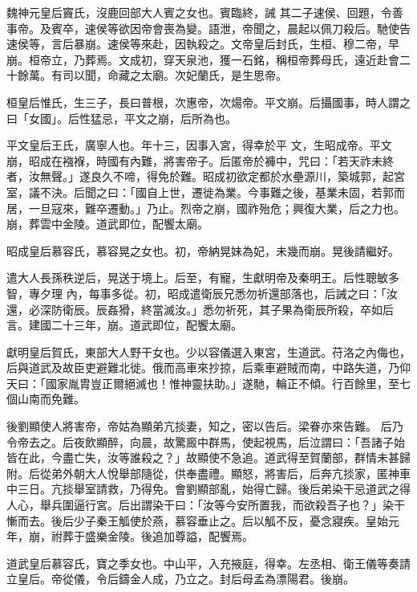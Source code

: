 \begin{pinyinscope}
 魏神元皇后竇氏，沒鹿回部大人賓之女也。賓臨終，誡
 其二子速侯、回題，令善事帝。及賓卒，速侯等欲因帝會喪為變。語泄，帝聞之，晨起以佩刀殺后。馳使告速侯等，言后暴崩。速侯等來赴，因執殺之。文帝皇后封氏，生桓、穆二帝，早崩。桓帝立，乃葬焉。文成初，穿天泉池，獲一石銘，稱桓帝葬母氏，遠近赴會二十餘萬。有司以聞，命藏之太廟。次妃蘭氏，是生思帝。



 桓皇后惟氏，生三子，長曰普根，次惠帝，次煬帝。平文崩。后攝國事，時人謂之曰「女國」。后性猛忌，平文之崩，后所為也。



 平文皇后王氏，廣寧人也。年十三，因事入宮，得幸於平
 文，生昭成帝。平文崩，昭成在襁褓，時國有內難，將害帝子。后匿帝於褲中，咒曰：「若天祚未終者，汝無聲。」遂良久不啼，得免於難。昭成初欲定都於水壘源川，築城郭，起宮室，議不決。后聞之曰：「國自上世，遷徙為業。今事難之後，基業未固，若郭而居，一旦寇來，難卒遷動。」乃止。烈帝之崩，國祚殆危；興復大業，后之力也。崩，葬雲中金陵。道武即位，配饗太廟。



 昭成皇后慕容氏，慕容晃之女也。初，帝納晃妹為妃，未幾而崩。晃後請繼好。



 遣大人長孫秩逆后，晃送于境上。后至，有寵，生獻明帝及秦明王。后性聰敏多智，專夕理
 內，每事多從。初，昭成遣衛辰兄悉勿祈還部落也，后誡之曰：「汝還，必深防衛辰。辰姦猾，終當滅汝。」悉勿祈死，其子果為衛辰所殺，卒如后言。建國二十三年，崩。道武即位，配饗太廟。



 獻明皇后賀氏，東部大人野干女也。少以容儀選入東宮，生道武。苻洛之內侮也，后與道武及故臣吏避難北徙。俄而高車來抄掠，后乘車避賊而南，中路失道，乃仰天曰：「國家胤胄豈正爾絕滅也！惟神靈扶助。」遂馳，輪正不傾。行百餘里，至七個山南而免難。



 後劉顯使人將害帝，帝姑為顯弟亢掞妻，知之，密以告后。梁眷亦來告難。
 后乃令帝去之。后夜飲顯醉，向晨，故驚廄中群馬，使起視馬，后泣謂曰：「吾諸子始皆在此，今盡亡失，汝等誰殺之？」故顯使不急追。道武得至賀蘭部，群情未甚歸附。后從弟外朝大人悅舉部隨從，供奉盡禮。顯怒，將害后，后奔亢掞家，匿神車中三日。亢掞舉室請救，乃得免。會劉顯部亂，始得亡歸。後后弟染干忌道武之得人心，舉兵圍逼行宮。后出謂染干曰：「汝等今安所置我，而欲殺吾子也？」染干慚而去。後后少子秦王觚使於燕，慕容垂止之。后以觚不反，憂念寢疾。皇始元年，崩，祔葬于盛樂金陵。後追加尊謚，配饗焉。



 道武皇后慕容氏，寶之季女也。中山平，入充掖庭，得幸。左丞相、衛王儀等奏請立皇后。帝從儀，令后鑄金人成，乃立之。封后母孟為漂陽君。後崩。




\end{pinyinscope}
